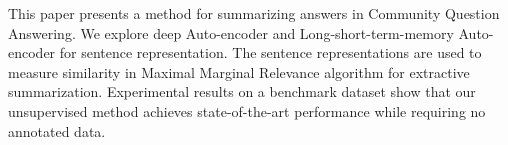 This paper presents a method for summarizing answers in Community Question Answering. We explore deep Auto-encoder and Long-short-term-memory Auto-encoder for sentence representation. The sentence representations are used to measure similarity in Maximal Marginal Relevance algorithm for extractive summarization. Experimental results on a benchmark dataset show that our unsupervised method achieves state-of-the-art performance while requiring no annotated data.
